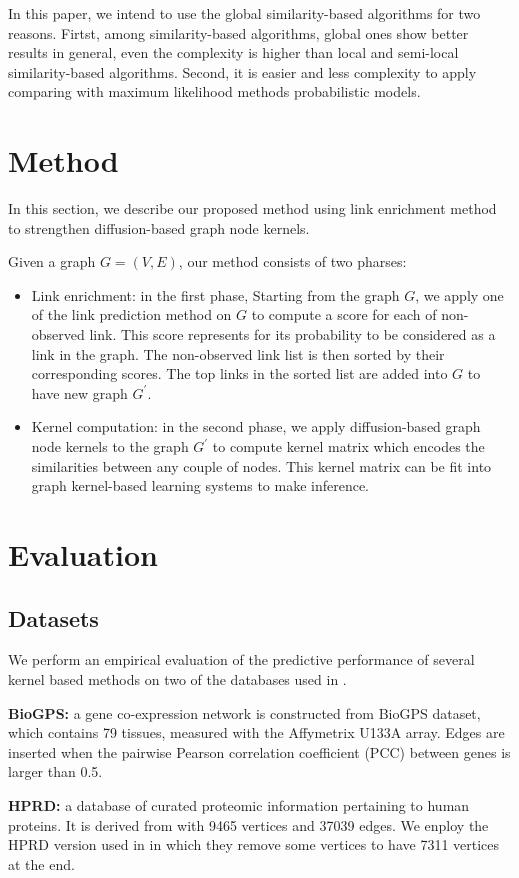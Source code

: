 \documentclass{article}
\begin{document}
In this paper, we intend to use the global similarity-based algorithms for two reasons. Firtst, among similarity-based algorithms, global ones show better results in general, even the complexity is higher than local and semi-local similarity-based algorithms. Second, it is easier and less complexity to apply comparing with maximum likelihood methods probabilistic models.

\section{Method}
\label{method}
In this section, we describe our proposed method using link enrichment method to strengthen diffusion-based graph node kernels.

Given a graph $G=(V, E)$, our method consists of two pharses:
\begin{itemize}
\item Link enrichment: in the first phase, Starting from the graph $G$, we apply one of the link prediction method on $G$ to compute a score for each of non-observed link. This score represents for its probability to be considered as a link in the graph. The non-observed link list is then sorted by their corresponding scores. The top links in the sorted list are added into $G$ to have new graph $G^{'}$.
\item Kernel computation: in the second phase, we apply diffusion-based graph node kernels to the graph $G^{'}$ to compute kernel matrix which encodes the similarities between any couple of nodes. This kernel matrix can be fit into graph kernel-based learning systems to make inference.
\end{itemize}
\section{Evaluation}
\label{evaluation}
\subsection{Datasets}
We perform an empirical evaluation of the predictive performance of several kernel based methods on two of the databases used in \cite{medk}.

\textbf{BioGPS:} a gene co-expression network is constructed from BioGPS dataset, which contains 79 tissues, measured with the Affymetrix U133A array. Edges are inserted when the pairwise Pearson correlation coefficient (PCC) between genes is larger than 0.5.

\textbf{HPRD:} a database of curated proteomic information pertaining to human proteins. It is derived from \cite{hprd} with 9465 vertices and 37039 edges. We enploy the HPRD version used in \cite{medk} in which they remove some vertices to have 7311 vertices at the end.
\end{document}

